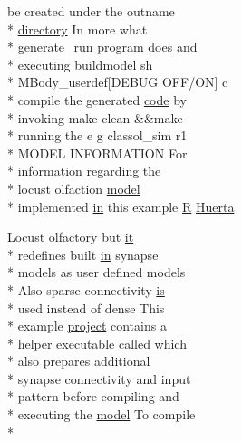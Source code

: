\begin{DoxyCompactItemize}
be created under the outname \\*
\hyperlink{README_8txt_ae619b68020535fba5ac79522a0d9d1c4}{directory} In more what \\*
\hyperlink{userproject_2MBody__userdef__project_2README_8txt_a320a215d1e27b4de394be70e90d22863}{generate\+\_\+run} program does and \\*
executing buildmodel sh \\*
M\+Body\+\_\+userdef\mbox{[}D\+E\+B\+U\+G O\+F\+F/O\+N\mbox{]} c \\*
compile the generated \hyperlink{userproject_2MBody__userdef__project_2README_8txt_aeec4e596748e7c29dd5548dae4c70685}{code} by \\*
invoking make clean \&\&make \\*
running the e g classol\+\_\+sim r1 \\*
M\+O\+D\+E\+L I\+N\+F\+O\+R\+M\+A\+T\+I\+O\+N For \\*
information regarding the \\*
locust olfaction \hyperlink{README_8txt_a69fd801b7213948c12d9dd7eebb3ed14}{model} \\*
implemented \hyperlink{README_8txt_a148897a6b2cc9cff25af80abb13426b0}{in} this example \hyperlink{gen__syns__sparse__izhModel_8cc_ac06fcc1e53c6b21275aec67047473a28}{R} \hyperlink{userproject_2MBody__userdef__project_2README_8txt_a85d00e8dfaf1bdfcd9e278d0560f8acb}{Huerta}
\item 
Locust olfactory but \hyperlink{userproject_2PoissonIzh__project_2README_8txt_a3e3bbb6c9b14c38757cf273a117e43e8}{it} \\*
redefines built \hyperlink{README_8txt_a148897a6b2cc9cff25af80abb13426b0}{in} synapse \\*
models as user defined models \\*
Also sparse connectivity \hyperlink{userproject_2MBody__userdef__project_2README_8txt_a7b4e6cf78d14ce882cb8ff127e01babd}{is} \\*
used instead of dense This \\*
example \hyperlink{userproject_2SynDelay__project_2README_8txt_a762c750134e07a31b7965860fd292b51}{project} contains a \\*
helper executable called which \\*
also prepares additional \\*
synapse connectivity and input \\*
pattern before compiling and \\*
executing the \hyperlink{README_8txt_a69fd801b7213948c12d9dd7eebb3ed14}{model} To compile \\*

\end{DoxyCompactItemize}
